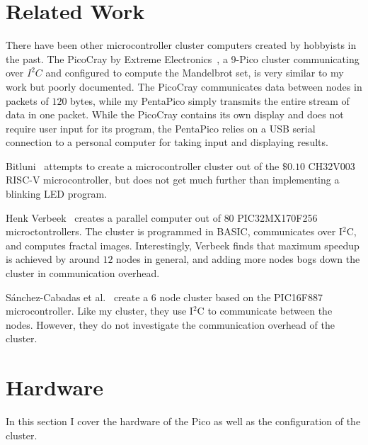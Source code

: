 \documentclass[conference]{IEEEtran}
\begin{document}
\section{Related Work}
\label{related_sec}

There have been other microcontroller cluster computers created by hobbyists in the past.
The PicoCray by Extreme Electronics~\cite{electronics:hackaday}, a 9-Pico cluster communicating over $I^2C$ and configured to compute the Mandelbrot set, is very similar to my work but poorly documented.
The PicoCray communicates data between nodes in packets of $120$ bytes, while my PentaPico simply transmits the entire stream of data in one packet. 
While the PicoCray contains its own display and does not require user input for its program, the PentaPico relies on a USB serial connection to a personal computer for taking input and displaying results.

Bitluni~\cite{bitluni:hackaday} attempts to create a microcontroller cluster out of the $\$0.10$ CH32V003 RISC-V microcontroller, but does not get much further than implementing a blinking LED program.

Henk Verbeek~\cite{verbeek:zapp} creates a parallel computer out of $80$ PIC32MX170F256 microctontrollers.
The cluster is programmed in BASIC, communicates over I$^2$C, and computes fractal images.
Interestingly, Verbeek finds that maximum speedup is achieved by around $12$ nodes in general, and adding more nodes bogs down the cluster in communication overhead.

Sánchez-Cabadas et al.~\cite{sanchez:JPCS} create a $6$ node cluster based on the PIC16F887 microcontroller. 
Like my cluster, they use I$^2$C to communicate between the nodes.
However, they do not investigate the communication overhead of the cluster.


\section{Hardware}
\label{hardware_sec}

In this section I cover the hardware of the Pico as well as the configuration of the cluster.
\end{document}
